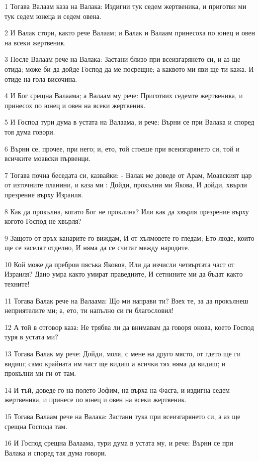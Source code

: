 \par 1 Тогава Валаам каза на Валака: Издигни тук седем жертвеника, и приготви ми тук седем юнеца и седем овена.
\par 2 И Валак стори, както рече Валаам; и Валак и Валаам принесоха по юнец и овен на всеки жертвеник.
\par 3 После Валаам рече на Валака: Застани близо при всеизгарянето си, и аз ще отида; може би да дойде Господ да ме посрещне; а каквото ми яви ще ти кажа. И отиде на гола височина.
\par 4 И Бог срещна Валаама; а Валаам му рече: Приготвих седемте жертвеника, и принесох по юнец и овен на всеки жертвеник.
\par 5 И Господ тури дума в устата на Валаама, и рече: Върни се при Валака и според тоя дума говори.
\par 6 Върни се, прочее, при него; и, ето, той стоеше при всеизгарянето си, той и всичките моавски първенци.
\par 7 Тогава почна беседата си, казвайки: - Валак ме доведе от Арам, Моавският цар от източните планини, и каза ми : Дойди, прокълни ми Якова, И дойди, хвърли презрение върху Израиля.
\par 8 Как да прокълна, когато Бог не проклина? Или как да хвърля презрение върху когото Господ не хвърля?
\par 9 Защото от връх канарите го виждам, И от хълмовете го гледам; Ето люде, които ще се заселят отделно, И няма да се считат между народите.
\par 10 Кой може да преброи пясъка Яковов, Или да изчисли четвъртата част от Израиля? Дано умра както умират праведните, И сетнините ми да бъдат както техните!
\par 11 Тогава Валак рече на Валаама: Що ми направи ти? Взех те, за да прокълнеш неприятелите ми; а, ето, ти напълно си ги благословил!
\par 12 А той в отговор каза: Не трябва ли да внимавам да говоря онова, което Господ туря в устата ми?
\par 13 Тогава Валак му рече: Дойди, моля, с мене на друго място, от гдето ще ги видиш; само крайната им част ще видиш а всички тях няма да видиш; и прокълни ми ги от там.
\par 14 И тъй, доведе го на полето Зофим, на върха на Фасга, и издигна седем жертвеника, и принесе по юнец и овен на всеки жертвеник.
\par 15 Тогава Валаам рече на Валака: Застани тука при всеизгарянето си, а аз ще срещна Господа там.
\par 16 И Господ срещна Валаама, тури дума в устата му, и рече: Върни се при Валака и според тая дума говори.
